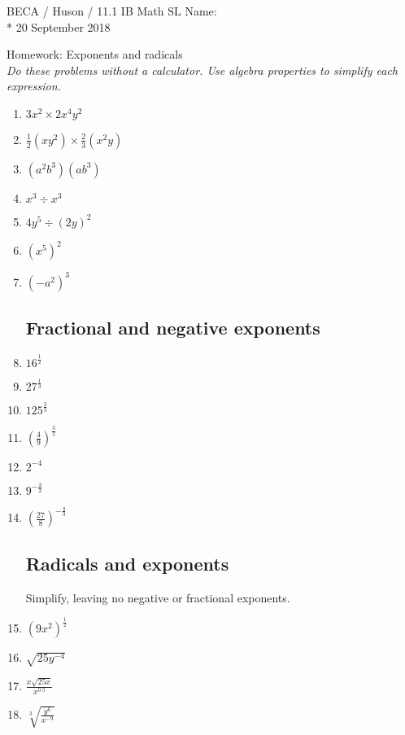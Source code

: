 \documentclass[]{book}
\begin{document}
\noindent BECA / Huson / 11.1 IB Math SL \hspace{2in} Name:\\*
20 September 2018
\begin{center}
{\Large Homework: Exponents and radicals}\\
\textit{Do these problems without a calculator. Use algebra properties to simplify each expression.}
\end{center}


\begin{enumerate}

\subsection*{Exponent rules}

\item $3x^2 \times 2x^4y^2$
\item $\displaystyle \frac{1}{2} (xy^2) \times \frac{2}{3}(x^2y)$
\item $(a^2b^3)(ab^3)$
\item $x^3 \div x^3$
\item $4y^5 \div (2y)^2$
\item $(x^5)^2$
\item $(-a^2)^3$

\subsection*{Fractional and negative exponents}

\item $\displaystyle  16^\frac{1}{2}$
\item $\displaystyle  27^\frac{1}{3}$
\item $\displaystyle  125^\frac{2}{3}$
\item $\displaystyle  (\frac{4}{9})^\frac{3}{2}$
\item $2^{-4}$
\item $9^{-\frac{3}{2}}$
\item $(\frac{27}{8})^{-\frac{4}{3}}$

\subsection*{Radicals and exponents}
Simplify, leaving no negative or fractional exponents.

\item $(9x^2)^\frac{1}{2}$
\item $\sqrt{25y^{-4}}$
\item $\displaystyle  \frac{x \sqrt{25x}}{x^{0.5}}$
\item $\displaystyle  \sqrt[3]{\frac{y^6}{x^{-9}}}$





\end{enumerate}
\end{document}
